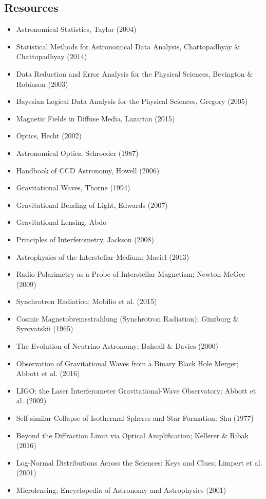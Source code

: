 \documentclass[a4paper,10pt]{article}
\begin{document}
\newpage
\subsection{Resources}

\begin{itemize}
    \item Astronomical Statistics, Taylor (2004)
    \item Statistical Methods for Astronomical Data Analysis, Chattopadhyay \& Chattopadhyay (2014)
    \item Data Reduction and Error Analysis for the Physical Sciences, Bevington \& Robinson (2003)
    \item Bayesian Logical Data Analysis for the Physical Sciences, Gregory (2005)
    \item Magnetic Fields in Diffuse Media, Lazarian (2015)
    \item Optics, Hecht (2002)
    \item Astronomical Optics, Schroeder (1987)
    \item Handbook of CCD Astronomy, Howell (2006)
    \item Gravitational Waves, Thorne (1994)
    \item Gravitational Bending of Light, Edwards (2007)
    \item Gravitational Lensing, Abdo
    \item Principles of Interferometry, Jackson (2008)
    \item Astrophysics of the Interstellar Medium; Maciel (2013)
    \item Radio Polarimetry as a Probe of Interstellar Magnetism; Newton-McGee (2009)
    \item Synchrotron Radiation; Mobilio et al. (2015)
    \item Cosmic Magnetobremsstrahlung (Synchrotron Radiation); Ginzburg \& Syrovatskii (1965)
    \item The Evolution of Neutrino Astronomy; Bahcall \& Davies (2000)
    \item Observation of Gravitational Waves from a Binary Black Hole Merger; Abbott et al. (2016)
    \item LIGO: the Laser Interferometer Gravitational-Wave Observatory; Abbott et al. (2009)
    \item Self-similar Collapse of Isothermal Spheres and Star Formation; Shu (1977)
    \item Beyond the Diffraction Limit via Optical Amplification; Kellerer \& Ribak (2016)
    \item Log-Normal Distributions Across the Sciences: Keys and Clues; Limpert et al. (2001)
    \item Microlensing; Encyclopedia of Astronomy and Astrophysics (2001)
\end{itemize}
\end{document}
